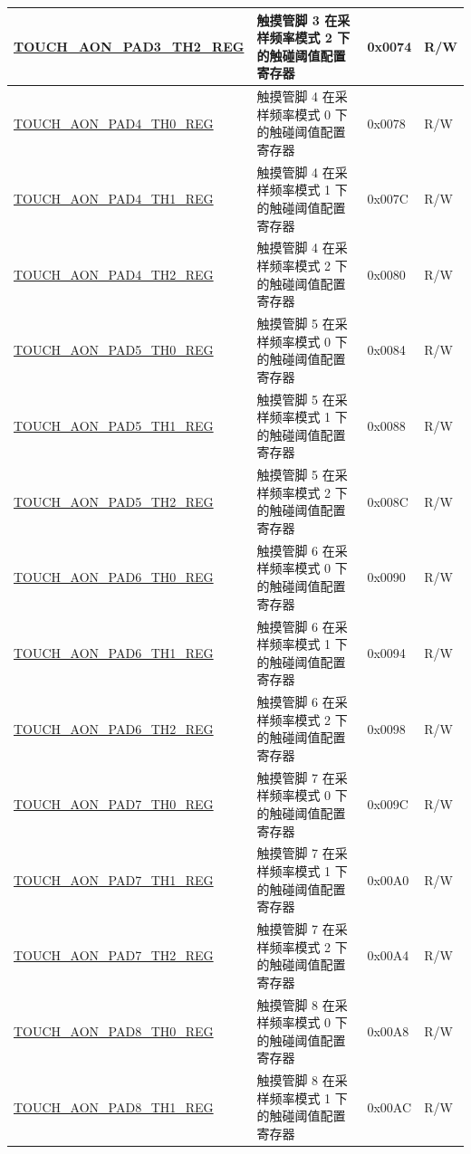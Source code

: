 \begin{longtable}{ | p{8cm} | p{10cm} | p{1.3cm} | p{1cm} | }
\hyperref[regdesc:TOUCHAONPADNTH2REG]{TOUCH\_AON\_PAD3\_TH2\_REG} & 触摸管脚 3 在采样频率模式 2 下的触碰阈值配置寄存器 & 0x0074 & R/W \\ \hline
\hyperref[regdesc:TOUCHAONPADNTH0REG]{TOUCH\_AON\_PAD4\_TH0\_REG} & 触摸管脚 4 在采样频率模式 0 下的触碰阈值配置寄存器 & 0x0078 & R/W \\ \hline
\hyperref[regdesc:TOUCHAONPADNTH1REG]{TOUCH\_AON\_PAD4\_TH1\_REG} & 触摸管脚 4 在采样频率模式 1 下的触碰阈值配置寄存器 & 0x007C & R/W \\ \hline
\hyperref[regdesc:TOUCHAONPADNTH2REG]{TOUCH\_AON\_PAD4\_TH2\_REG} & 触摸管脚 4 在采样频率模式 2 下的触碰阈值配置寄存器 & 0x0080 & R/W \\ \hline
\hyperref[regdesc:TOUCHAONPADNTH0REG]{TOUCH\_AON\_PAD5\_TH0\_REG} & 触摸管脚 5 在采样频率模式 0 下的触碰阈值配置寄存器 & 0x0084 & R/W \\ \hline
\hyperref[regdesc:TOUCHAONPADNTH1REG]{TOUCH\_AON\_PAD5\_TH1\_REG} & 触摸管脚 5 在采样频率模式 1 下的触碰阈值配置寄存器 & 0x0088 & R/W \\ \hline
\hyperref[regdesc:TOUCHAONPADNTH2REG]{TOUCH\_AON\_PAD5\_TH2\_REG} & 触摸管脚 5 在采样频率模式 2 下的触碰阈值配置寄存器 & 0x008C & R/W \\ \hline
\hyperref[regdesc:TOUCHAONPADNTH0REG]{TOUCH\_AON\_PAD6\_TH0\_REG} & 触摸管脚 6 在采样频率模式 0 下的触碰阈值配置寄存器 & 0x0090 & R/W \\ \hline
\hyperref[regdesc:TOUCHAONPADNTH1REG]{TOUCH\_AON\_PAD6\_TH1\_REG} & 触摸管脚 6 在采样频率模式 1 下的触碰阈值配置寄存器 & 0x0094 & R/W \\ \hline
\hyperref[regdesc:TOUCHAONPADNTH2REG]{TOUCH\_AON\_PAD6\_TH2\_REG} & 触摸管脚 6 在采样频率模式 2 下的触碰阈值配置寄存器 & 0x0098 & R/W \\ \hline
\hyperref[regdesc:TOUCHAONPADNTH0REG]{TOUCH\_AON\_PAD7\_TH0\_REG} & 触摸管脚 7 在采样频率模式 0 下的触碰阈值配置寄存器 & 0x009C & R/W \\ \hline
\hyperref[regdesc:TOUCHAONPADNTH1REG]{TOUCH\_AON\_PAD7\_TH1\_REG} & 触摸管脚 7 在采样频率模式 1 下的触碰阈值配置寄存器 & 0x00A0 & R/W \\ \hline
\hyperref[regdesc:TOUCHAONPADNTH2REG]{TOUCH\_AON\_PAD7\_TH2\_REG} & 触摸管脚 7 在采样频率模式 2 下的触碰阈值配置寄存器 & 0x00A4 & R/W \\ \hline
\hyperref[regdesc:TOUCHAONPADNTH0REG]{TOUCH\_AON\_PAD8\_TH0\_REG} & 触摸管脚 8 在采样频率模式 0 下的触碰阈值配置寄存器 & 0x00A8 & R/W \\ \hline
\hyperref[regdesc:TOUCHAONPADNTH1REG]{TOUCH\_AON\_PAD8\_TH1\_REG} & 触摸管脚 8 在采样频率模式 1 下的触碰阈值配置寄存器 & 0x00AC & R/W \\ \hline

\end{longtable}
